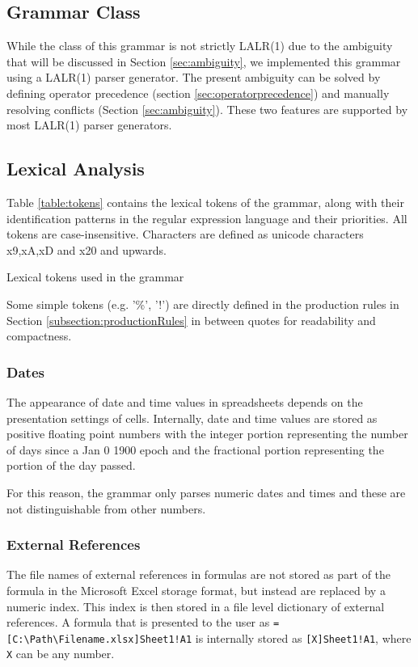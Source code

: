 \documentclass[times]{smrauth}
\begin{document}
\subsection{Grammar Class}

While the class of this grammar is not strictly LALR(1) due to the ambiguity that will be discussed in Section \ref{sec:ambiguity}, we implemented this grammar using a LALR(1) parser generator.
The present ambiguity can be solved by defining operator precedence (section \ref{sec:operatorprecedence}) and manually resolving conflicts (Section \ref{sec:ambiguity}).
These two features are supported by most LALR(1) parser generators.

\subsection{Lexical Analysis}
Table \ref{table:tokens} contains the lexical tokens of the grammar, along with their identification patterns in the regular expression language and their priorities. All tokens are case-insensitive.
Characters are defined as unicode characters x9,xA,xD and x20 and upwards.

\begin{table}
	\vspace{2mm}
	\caption{Lexical tokens used in the grammar}
	\label{table:tokens}
	\centering
	
\end{table}

Some simple tokens (e.g. '\%', '!') are directly defined in the production rules in Section \ref{subsection:productionRules} in between quotes for readability and compactness.

\subsubsection{\textbf{Dates}}

The appearance of date and time values in spreadsheets depends on the presentation settings of cells. Internally, date and time values are stored as positive floating point numbers with the integer portion representing the number of days since a Jan 0 1900 epoch and the fractional portion representing the portion of the day passed.

For this reason, the grammar only parses numeric dates and times and these are not distinguishable from other numbers.

\subsubsection{\textbf{External References}}
\label{section:externalReferences}
The file names of external references in formulas are not stored as part of the formula in the Microsoft Excel storage format, but instead are replaced by a numeric index.
This index is then stored in a file level dictionary of external references.
A formula that is presented to the user as \texttt{=[C:\textbackslash Path\textbackslash Filename.xlsx]Sheet1!A1} is internally stored as \texttt{[X]Sheet1!A1}, where \texttt{X} can be any number.
\end{document}
